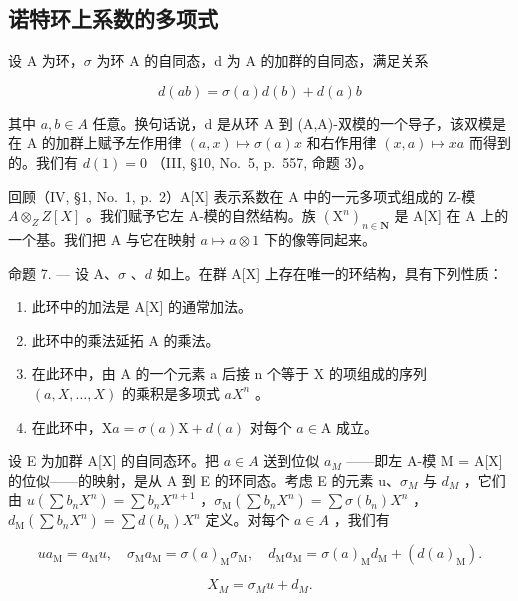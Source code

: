 \subsection{诺特环上系数的多项式}

设 A 为环，\(\sigma\) 为环 A 的自同态，d 为 A 的加群的自同态，满足关系

\[
d (a b) = \sigma (a) d (b) + d (a) b\tag{1}
\]

其中 \(a, b \in A\) 任意。换句话说，d 是从环 A 到 (A,A)-双模的一个导子，该双模是在 A 的加群上赋予左作用律 \((a, x) \mapsto \sigma(a)x\) 和右作用律 \((x, a) \mapsto xa\) 而得到的。我们有 \(d(1) = 0\) （III, §10, No.~5, p.~557, 命题 3）。

回顾（IV, §1, No.~1, p.~2）A{[}X{]} 表示系数在 A 中的一元多项式组成的 Z-模 \(A \otimes_{Z} Z[X]\) 。我们赋予它左 A-模的自然结构。族 \((\mathrm{X}^{n})_{n \in \mathbf{N}}\) 是 A{[}X{]} 在 A 上的一个基。我们把 A 与它在映射 \(a \mapsto a \otimes 1\) 下的像等同起来。

命题 7. --- 设 A、\(\sigma\) 、\(d\) 如上。在群 A{[}X{]} 上存在唯一的环结构，具有下列性质：

\begin{enumerate}
\def\labelenumi{\alph{enumi})}
\item
  此环中的加法是 A{[}X{]} 的通常加法。
\item
  此环中的乘法延拓 A 的乘法。
\item
  在此环中，由 A 的一个元素 a 后接 n 个等于 X 的项组成的序列 \((a,X,\ldots,X)\) 的乘积是多项式 \(aX^{n}\) 。
\item
  在此环中，\(\mathrm{X}a = \sigma(a)\mathrm{X} + d(a)\) 对每个 \(a \in \mathrm{A}\) 成立。
\end{enumerate}

设 E 为加群 A{[}X{]} 的自同态环。把 \(a \in A\) 送到位似 \(a_{M}\) ——即左 A-模 M = A{[}X{]} 的位似——的映射，是从 A 到 E 的环同态。考虑 E 的元素 u、\(\sigma_{M}\) 与 \(d_{M}\) ，它们由 \(u(\sum b_{n}X^{n}) = \sum b_{n}X^{n+1}\) ，\(\sigma_{\mathrm{M}}(\sum b_{n}X^{n}) = \sum \sigma(b_{n})X^{n}\) ，\(d_{\mathrm{M}}(\sum b_{n}X^{n}) = \sum d(b_{n})X^{n}\) 定义。对每个 \(a \in A\) ，我们有

\[
u a _ {\mathrm{M}} = a _ {\mathrm{M}} u, \quad \sigma_ {\mathrm{M}} a _ {\mathrm{M}} = \sigma (a) _ {\mathrm{M}} \sigma_ {\mathrm{M}}, \quad d _ {\mathrm{M}} a _ {\mathrm{M}} = \sigma (a) _ {\mathrm{M}} d _ {\mathrm{M}} + (d (a) _ {\mathrm{M}}).\tag{2}
\]

\[
X_ {M} = \sigma_ {M} u+ d_ {M} .\tag{3}
\]

